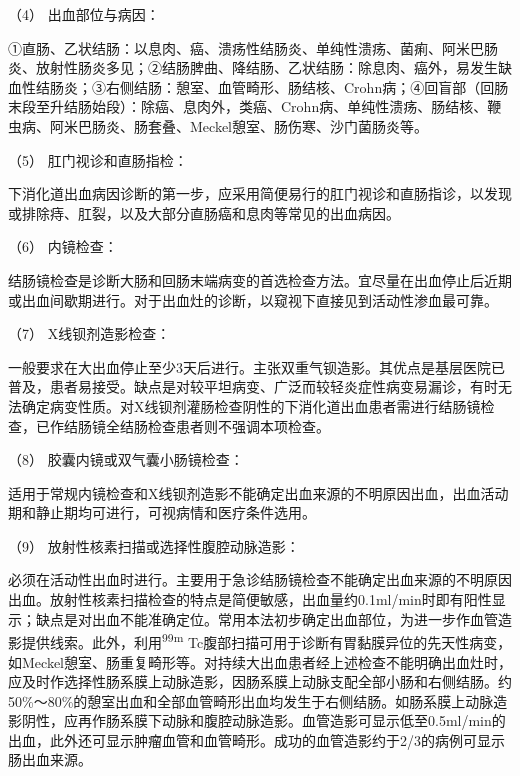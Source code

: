 \hypertarget{text00033.htmlux5cux23CHP1-13-2-1-5-4}{}
（4） 出血部位与病因：

①直肠、乙状结肠：以息肉、癌、溃疡性结肠炎、单纯性溃疡、菌痢、阿米巴肠炎、放射性肠炎多见；②结肠脾曲、降结肠、乙状结肠：除息肉、癌外，易发生缺血性结肠炎；③右侧结肠：憩室、血管畸形、肠结核、Crohn病；④回盲部（回肠末段至升结肠始段）：除癌、息肉外，类癌、Crohn病、单纯性溃疡、肠结核、鞭虫病、阿米巴肠炎、肠套叠、Meckel憩室、肠伤寒、沙门菌肠炎等。

\hypertarget{text00033.htmlux5cux23CHP1-13-2-1-5-5}{}
（5） 肛门视诊和直肠指检：

下消化道出血病因诊断的第一步，应采用简便易行的肛门视诊和直肠指诊，以发现或排除痔、肛裂，以及大部分直肠癌和息肉等常见的出血病因。

\hypertarget{text00033.htmlux5cux23CHP1-13-2-1-5-6}{}
（6） 内镜检查：

结肠镜检查是诊断大肠和回肠末端病变的首选检查方法。宜尽量在出血停止后近期或出血间歇期进行。对于出血灶的诊断，以窥视下直接见到活动性渗血最可靠。

\hypertarget{text00033.htmlux5cux23CHP1-13-2-1-5-7}{}
（7） X线钡剂造影检查：

一般要求在大出血停止至少3天后进行。主张双重气钡造影。其优点是基层医院已普及，患者易接受。缺点是对较平坦病变、广泛而较轻炎症性病变易漏诊，有时无法确定病变性质。对X线钡剂灌肠检查阴性的下消化道出血患者需进行结肠镜检查，已作结肠镜全结肠检查患者则不强调本项检查。

\hypertarget{text00033.htmlux5cux23CHP1-13-2-1-5-8}{}
（8） 胶囊内镜或双气囊小肠镜检查：

适用于常规内镜检查和X线钡剂造影不能确定出血来源的不明原因出血，出血活动期和静止期均可进行，可视病情和医疗条件选用。

\hypertarget{text00033.htmlux5cux23CHP1-13-2-1-5-9}{}
（9） 放射性核素扫描或选择性腹腔动脉造影：

必须在活动性出血时进行。主要用于急诊结肠镜检查不能确定出血来源的不明原因出血。放射性核素扫描检查的特点是简便敏感，出血量约0.1ml/min时即有阳性显示；缺点是对出血不能准确定位。常用本法初步确定出血部位，为进一步作血管造影提供线索。此外，利用\textsuperscript{99m}
Tc腹部扫描可用于诊断有胃黏膜异位的先天性病变，如Meckel憩室、肠重复畸形等。对持续大出血患者经上述检查不能明确出血灶时，应及时作选择性肠系膜上动脉造影，因肠系膜上动脉支配全部小肠和右侧结肠。约50\%～80\%的憩室出血和全部血管畸形出血均发生于右侧结肠。如肠系膜上动脉造影阴性，应再作肠系膜下动脉和腹腔动脉造影。血管造影可显示低至0.5ml/min的出血，此外还可显示肿瘤血管和血管畸形。成功的血管造影约于2/3的病例可显示肠出血来源。

